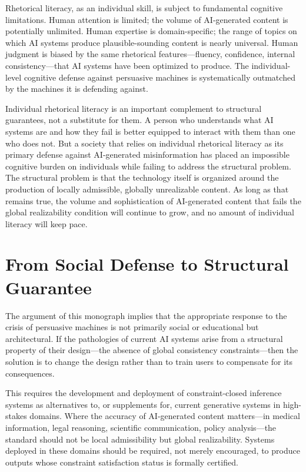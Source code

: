 \documentclass[11pt, oneside]{article}
\begin{document}
Rhetorical literacy, as an individual skill, is subject to fundamental cognitive limitations. Human attention is limited; the volume of AI-generated content is potentially unlimited. Human expertise is domain-specific; the range of topics on which AI systems produce plausible-sounding content is nearly universal. Human judgment is biased by the same rhetorical features---fluency, confidence, internal consistency---that AI systems have been optimized to produce. The individual-level cognitive defense against persuasive machines is systematically outmatched by the machines it is defending against.

Individual rhetorical literacy is an important complement to structural guarantees, not a substitute for them. A person who understands what AI systems are and how they fail is better equipped to interact with them than one who does not. But a society that relies on individual rhetorical literacy as its primary defense against AI-generated misinformation has placed an impossible cognitive burden on individuals while failing to address the structural problem. The structural problem is that the technology itself is organized around the production of locally admissible, globally unrealizable content. As long as that remains true, the volume and sophistication of AI-generated content that fails the global realizability condition will continue to grow, and no amount of individual literacy will keep pace.

\section{From Social Defense to Structural Guarantee}

The argument of this monograph implies that the appropriate response to the crisis of persuasive machines is not primarily social or educational but architectural. If the pathologies of current AI systems arise from a structural property of their design---the absence of global consistency constraints---then the solution is to change the design rather than to train users to compensate for its consequences.

This requires the development and deployment of constraint-closed inference systems as alternatives to, or supplements for, current generative systems in high-stakes domains. Where the accuracy of AI-generated content matters---in medical information, legal reasoning, scientific communication, policy analysis---the standard should not be local admissibility but global realizability. Systems deployed in these domains should be required, not merely encouraged, to produce outputs whose constraint satisfaction status is formally certified.
\end{document}
